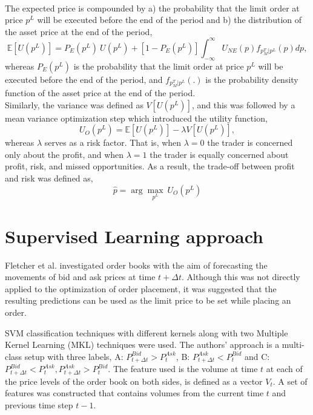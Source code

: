\hfill
\\
The expected price is compounded by a) the probability that the limit order at price $p^L$ will be executed before the end of the period and b) the distribution of the asset price at the end of the period,
\begin{equation}
    \mathbb{E}[U(p^L)] = P_E(p^L)\ U(p^L) + [1-P_E(p^L)] \int_{-\infty}^{\infty} U_{NE}(p) f_{p_M^T | p^L}(p) dp,
\end{equation}
whereas $P_E(p^L)$ is the probability that the limit order at price $p^L$ will be executed before the end of the period, and $f_{p_M^T | p^L}(.)$ is the probability density function of the asset price at the end of the period. 
\\
Similarly, the variance was defined as $V[U(p^L)]$, and this was followed by a mean variance optimization step which introduced the utility function,
\begin{equation}
    U_O(p^L) = \mathbb{E}[U(p^L)] - \lambda V[U(p^L)],
\end{equation}
whereas $\lambda$ serves as a risk factor.
That is, when $\lambda=0$ the trader is concerned only about the profit, and when $\lambda=1$ the trader is equally concerned about profit, risk, and missed opportunities.
As a result, the trade-off between profit and risk was defined as,
\begin{equation}
    \hat{p} = \arg\max_{p^L}\ U_O(p^L)
\end{equation}


\section{Supervised Learning approach}
\label{sec:related-supervised}

Fletcher et al. \cite{fletcher2010multiple} investigated order books with the aim of forecasting the movements of bid and ask prices at time $t+\Delta{t}$.
Although this was not directly applied to the optimization of order placement, it was suggested that the resulting predictions can be used as the limit price to be set while placing an order.

SVM classification techniques with different kernels along with two Multiple Kernel Learning (MKL) techniques were used.
The authors' approach is a multi-class setup with three labels, A: $P_{t+\Delta{t}}^{Bid} > P_t^{Ask}$, B: $P_{t+\Delta{t}}^{Ask} < P_t^{Bid}$ and C: $P_{t+\Delta{t}}^{Bid} < P_t^{Ask}, P_{t+\Delta{t}}^{Ask} > P_t^{Bid}$.
The feature used is the volume at time $t$ at each of the price levels of the order book on both sides, is defined as a vector $V_t$.
A set of features was constructed that contains volumes from the current time $t$ and previous time step $t-1$.

